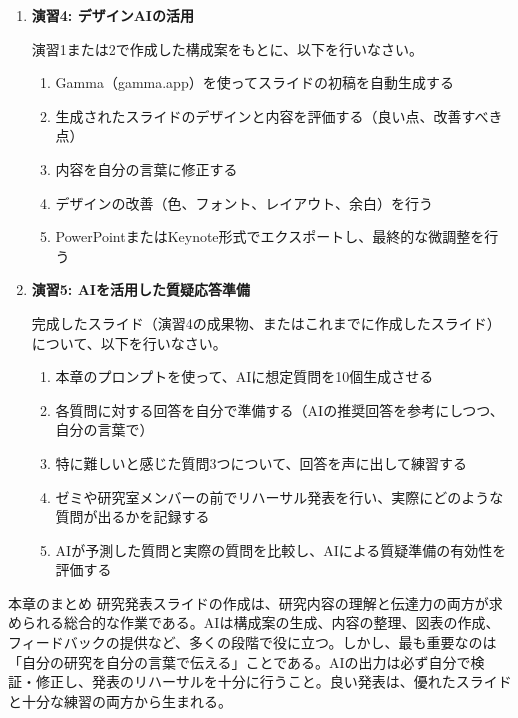 \begin{enumerate}
\item \textbf{演習4: デザインAIの活用}

演習1または2で作成した構成案をもとに、以下を行いなさい。
\begin{enumerate}
\item Gamma（gamma.app）を使ってスライドの初稿を自動生成する
\item 生成されたスライドのデザインと内容を評価する（良い点、改善すべき点）
\item 内容を自分の言葉に修正する
\item デザインの改善（色、フォント、レイアウト、余白）を行う
\item PowerPointまたはKeynote形式でエクスポートし、最終的な微調整を行う
\end{enumerate}

\item \textbf{演習5: AIを活用した質疑応答準備}

完成したスライド（演習4の成果物、またはこれまでに作成したスライド）について、以下を行いなさい。
\begin{enumerate}
\item 本章のプロンプトを使って、AIに想定質問を10個生成させる
\item 各質問に対する回答を自分で準備する（AIの推奨回答を参考にしつつ、自分の言葉で）
\item 特に難しいと感じた質問3つについて、回答を声に出して練習する
\item ゼミや研究室メンバーの前でリハーサル発表を行い、実際にどのような質問が出るかを記録する
\item AIが予測した質問と実際の質問を比較し、AIによる質疑準備の有効性を評価する
\end{enumerate}

\end{enumerate}

\vspace{10mm}
\begin{itembox}[l]{本章のまとめ}
研究発表スライドの作成は、研究内容の理解と伝達力の両方が求められる総合的な作業である。AIは構成案の生成、内容の整理、図表の作成、フィードバックの提供など、多くの段階で役に立つ。しかし、最も重要なのは「自分の研究を自分の言葉で伝える」ことである。AIの出力は必ず自分で検証・修正し、発表のリハーサルを十分に行うこと。良い発表は、優れたスライドと十分な練習の両方から生まれる。
\end{itembox}
